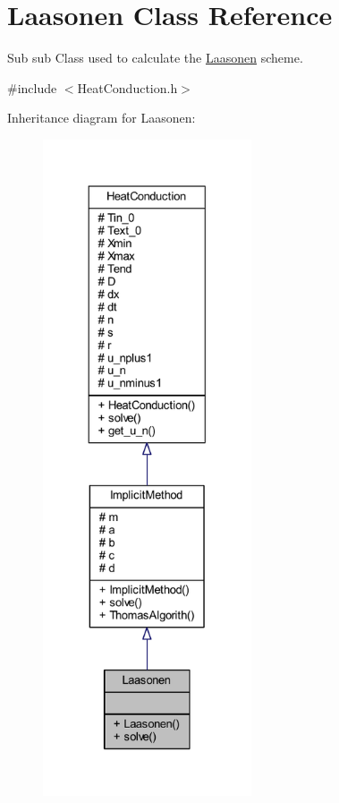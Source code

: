 \hypertarget{class_laasonen}{}\section{Laasonen Class Reference}
\label{class_laasonen}


Sub sub Class used to calculate the \hyperlink{class_laasonen}{Laasonen} scheme.  




{\ttfamily \#include $<$Heat\+Conduction.\+h$>$}



Inheritance diagram for Laasonen\+:
\nopagebreak
\begin{figure}[H]
\begin{center}
\leavevmode
\includegraphics[height=550pt]{class_laasonen__inherit__graph}
\end{center}
\end{figure}


